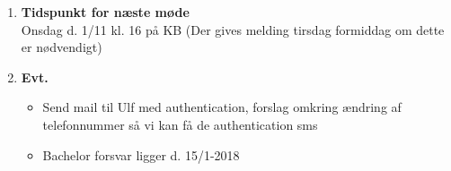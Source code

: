 \begin{enumerate}
		\item \textbf{Tidspunkt for næste møde} \\
			Onsdag d. 1/11 kl. 16 på KB (Der gives melding tirsdag formiddag om dette er nødvendigt)
			
		\item \textbf{Evt.}
			\begin{itemize}[-]
				\item Send mail til Ulf med authentication, forslag omkring ændring af telefonnummer så vi kan få de authentication sms
				
				\item Bachelor forsvar ligger d. 15/1-2018
			\end{itemize}
			
	\end{enumerate}
